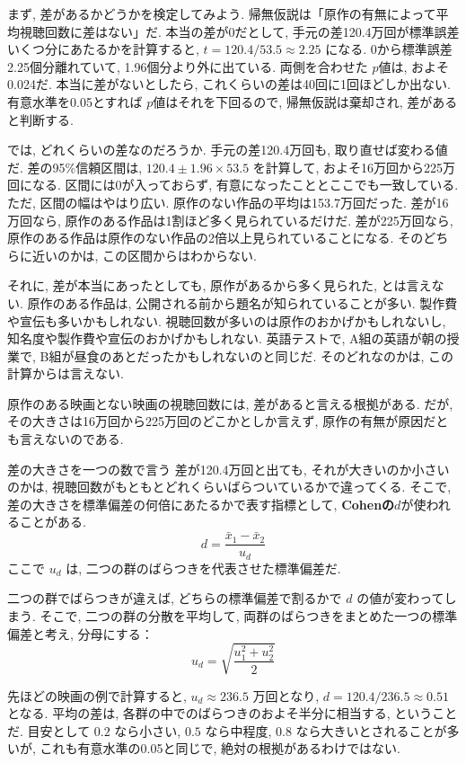     まず, 差があるかどうかを検定してみよう.
    帰無仮説は「原作の有無によって平均視聴回数に差はない」だ.
    本当の差が0だとして, 手元の差120.4万回が標準誤差いくつ分にあたるかを計算すると, $t = 120.4 / 53.5 \approx 2.25$ になる.
    0から標準誤差2.25個分離れていて, 1.96個分より外に出ている.
    両側を合わせた $p$値は, およそ0.024だ.
    本当に差がないとしたら, これくらいの差は40回に1回ほどしか出ない.
    有意水準を0.05とすれば $p$値はそれを下回るので, 帰無仮説は棄却され, 差があると判断する.

    では, どれくらいの差なのだろうか.
    手元の差120.4万回も, 取り直せば変わる値だ.
    差の95\%信頼区間は, $120.4 \pm 1.96 \times 53.5$ を計算して, およそ16万回から225万回になる.
    区間には0が入っておらず, 有意になったこととここでも一致している.
    ただ, 区間の幅はやはり広い.
    原作のない作品の平均は153.7万回だった.
    差が16万回なら, 原作のある作品は1割ほど多く見られているだけだ.
    差が225万回なら, 原作のある作品は原作のない作品の2倍以上見られていることになる.
    そのどちらに近いのかは, この区間からはわからない.

    それに, 差が本当にあったとしても, 原作があるから多く見られた, とは言えない.
    原作のある作品は, 公開される前から題名が知られていることが多い.
    製作費や宣伝も多いかもしれない.
    視聴回数が多いのは原作のおかげかもしれないし, 知名度や製作費や宣伝のおかげかもしれない.
    英語テストで, A組の英語が朝の授業で, B組が昼食のあとだったかもしれないのと同じだ.
    そのどれなのかは, この計算からは言えない.

    原作のある映画とない映画の視聴回数には, 差があると言える根拠がある.
    だが, その大きさは16万回から225万回のどこかとしか言えず, 原作の有無が原因だとも言えないのである.

  \begin{mybox}{差の大きさを一つの数で言う}
    差が120.4万回と出ても, それが大きいのか小さいのかは, 視聴回数がもともとどれくらいばらついているかで違ってくる.
    そこで, 差の大きさを標準偏差の何倍にあたるかで表す指標として, \textbf{Cohenの$d$}が使われることがある.
    \[
      d = \frac{\bar{x}_1 - \bar{x}_2}{u_d}
    \]
    ここで $u_d$ は, 二つの群のばらつきを代表させた標準偏差だ.

    二つの群でばらつきが違えば, どちらの標準偏差で割るかで $d$ の値が変わってしまう.
    そこで, 二つの群の分散を平均して, 両群のばらつきをまとめた一つの標準偏差と考え, 分母にする：
    \[
      u_d = \sqrt{\frac{u_1^2 + u_2^2}{2}}
    \]

    先ほどの映画の例で計算すると, $u_d \approx 236.5$ 万回となり, $d = 120.4 / 236.5 \approx 0.51$ となる.
    平均の差は, 各群の中でのばらつきのおよそ半分に相当する, ということだ.
    目安として $0.2$ なら小さい, $0.5$ なら中程度, $0.8$ なら大きいとされることが多いが, これも有意水準の0.05と同じで, 絶対の根拠があるわけではない.
  \end{mybox}
